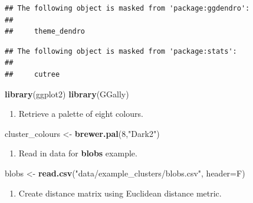 \documentclass[]{book}
\newenvironment{Shaded}{\begin{snugshade}}{\end{snugshade}}
\newcommand{\KeywordTok}[1]{\textcolor[rgb]{0.13,0.29,0.53}{\textbf{{#1}}}}
\newcommand{\DataTypeTok}[1]{\textcolor[rgb]{0.13,0.29,0.53}{{#1}}}
\newcommand{\DecValTok}[1]{\textcolor[rgb]{0.00,0.00,0.81}{{#1}}}
\newcommand{\StringTok}[1]{\textcolor[rgb]{0.31,0.60,0.02}{{#1}}}
\newcommand{\NormalTok}[1]{{#1}}
\providecommand{\tightlist}{%
  \setlength{\itemsep}{0pt}\setlength{\parskip}{0pt}}
\theoremstyle{definition}
\theoremstyle{definition}
\theoremstyle{definition}
\theoremstyle{remark}
\begin{document}
\begin{verbatim}
## The following object is masked from 'package:ggdendro':
## 
##     theme_dendro
\end{verbatim}

\begin{verbatim}
## The following object is masked from 'package:stats':
## 
##     cutree
\end{verbatim}

\begin{Shaded}
\begin{Highlighting}[]
\KeywordTok{library}\NormalTok{(ggplot2)}
\KeywordTok{library}\NormalTok{(GGally)}
\end{Highlighting}
\end{Shaded}

\begin{enumerate}
\def\labelenumi{\arabic{enumi}.}
\setcounter{enumi}{1}
\tightlist
\item
  Retrieve a palette of eight colours.
\end{enumerate}

\begin{Shaded}
\begin{Highlighting}[]
\NormalTok{cluster_colours <-}\StringTok{ }\KeywordTok{brewer.pal}\NormalTok{(}\DecValTok{8}\NormalTok{,}\StringTok{"Dark2"}\NormalTok{)}
\end{Highlighting}
\end{Shaded}

\begin{enumerate}
\def\labelenumi{\arabic{enumi}.}
\setcounter{enumi}{2}
\tightlist
\item
  Read in data for \textbf{blobs} example.
\end{enumerate}

\begin{Shaded}
\begin{Highlighting}[]
\NormalTok{blobs <-}\StringTok{ }\KeywordTok{read.csv}\NormalTok{(}\StringTok{"data/example_clusters/blobs.csv"}\NormalTok{, }\DataTypeTok{header=}\NormalTok{F)}
\end{Highlighting}
\end{Shaded}

\begin{enumerate}
\def\labelenumi{\arabic{enumi}.}
\setcounter{enumi}{3}
\tightlist
\item
  Create distance matrix using Euclidean distance metric.
\end{enumerate}
\end{document}
